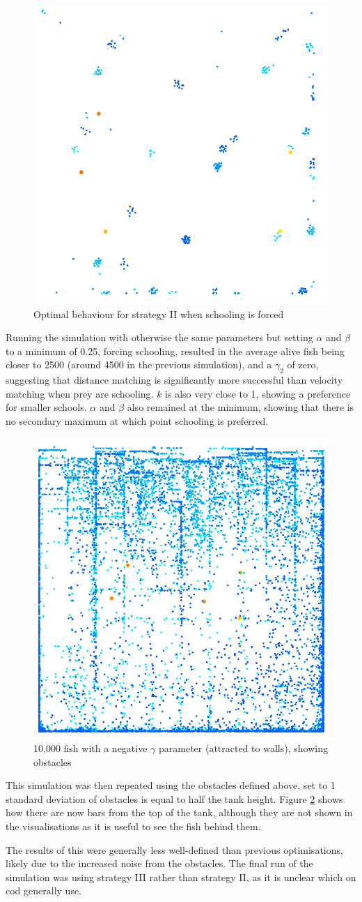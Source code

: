 \begin{figure}
    \centering
    \includegraphics[width=0.5\linewidth]{fig/ii_forced.png}
    \caption{Optimal behaviour for strategy II when schooling is forced}
    \label{fig:placeholder}
\end{figure}
Running the simulation with otherwise the same parameters but setting $\alpha$ and $\beta$ to a minimum of 0.25, forcing schooling, resulted in the average alive fish being closer to 2500 (around 4500 in the previous simulation), and a $\gamma_2$ of zero, suggesting that distance matching is significantly more successful than velocity matching when prey are schooling. $k$ is also very close to 1, showing a preference for smaller schools. $\alpha$ and $\beta$ also remained at the minimum, showing that there is no secondary maximum at which point schooling is preferred.
\begin{figure}
    \centering
    \includegraphics[width=0.5\linewidth]{fig/many_fish.png}
    \caption{10,000 fish with a negative $\gamma$ parameter (attracted to walls), showing obstacles}
    \label{fig:forced walls}
\end{figure}
This simulation was then repeated using the obstacles defined above, set to 1 standard deviation of obstacles is equal to half the tank height. Figure \ref{fig:forced walls} shows how there are now bars from the top of the tank, although they are not shown in the visualisations as it is useful to see the fish behind them.\par
The results of this were generally less well-defined than previous optimisations, likely due to the increased noise from the obstacles. 
The final run of the simulation was using strategy III rather than strategy II, as it is unclear which on cod generally use. \\
[RESULT + VISUALISATION]